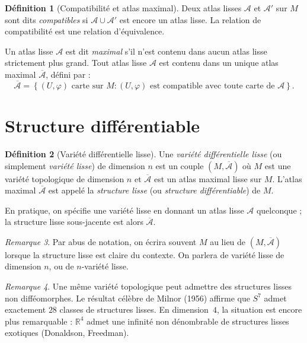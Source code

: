 \documentclass[12pt,a4paper,openany]{book}
\theoremstyle{definition}
\newtheorem{definition}{Définition}[chapter]
\theoremstyle{plain}
\theoremstyle{remark}
\newtheorem{remarque}[definition]{Remarque}
\newcommand{\R}{\mathbb{R}}
\newcommand{\set}[1]{\left\{#1\right\}}
\begin{document}
\begin{definition}[Compatibilité et atlas maximal]\label{def:atlas-maximal}
Deux atlas lisses $\mathcal{A}$ et $\mathcal{A}'$ sur $M$ sont dits
\emph{compatibles} si $\mathcal{A} \cup \mathcal{A}'$ est encore un atlas
lisse. La relation de compatibilité est une relation d'équivalence.

Un atlas lisse $\mathcal{A}$ est dit \emph{maximal} s'il n'est contenu dans
aucun atlas lisse strictement plus grand. Tout atlas lisse $\mathcal{A}$ est
contenu dans un unique atlas maximal $\overline{\mathcal{A}}$, défini par :
\[
    \overline{\mathcal{A}} = \set{(U, \varphi) \text{ carte sur } M :
    (U, \varphi) \text{ est compatible avec toute carte de } \mathcal{A}}.
\]
\end{definition}


\section{Structure différentiable}
\label{sec:structure-diff}

\begin{definition}[Variété différentielle lisse]\label{def:variete-lisse}
Une \emph{variété différentielle lisse} (ou simplement \emph{variété lisse})
de dimension $n$ est un couple $(M, \overline{\mathcal{A}})$ où $M$ est une
variété topologique de dimension $n$ et $\overline{\mathcal{A}}$ est un atlas
maximal lisse sur $M$. L'atlas maximal $\overline{\mathcal{A}}$ est appelé
la \emph{structure lisse} (ou \emph{structure différentiable}) de $M$.

En pratique, on spécifie une variété lisse en donnant un atlas lisse
$\mathcal{A}$ quelconque ; la structure lisse sous-jacente est alors
$\overline{\mathcal{A}}$.
\end{definition}

\begin{remarque}\label{rem:variete-notation}
Par abus de notation, on écrira souvent $M$ au lieu de $(M,
\overline{\mathcal{A}})$ lorsque la structure lisse est claire du contexte.
On parlera de variété lisse de dimension $n$, ou de $n$-variété lisse.
\end{remarque}

\begin{remarque}\label{rem:structures-exotiques}
Une même variété topologique peut admettre des structures lisses non
difféomorphes. Le résultat célèbre de Milnor (1956) affirme que $S^7$ admet
exactement $28$ classes de structures lisses. En dimension~$4$, la situation
est encore plus remarquable : $\R^4$ admet une infinité non dénombrable de
structures lisses exotiques (Donaldson, Freedman).
\end{remarque}
\end{document}
